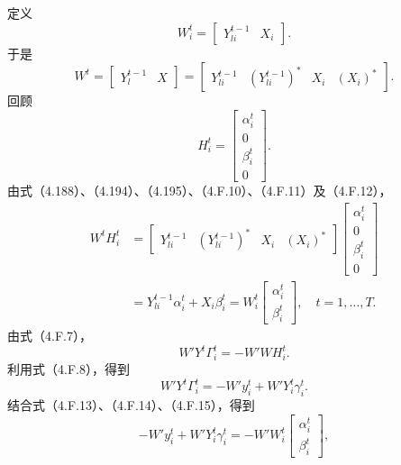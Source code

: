 定义
\begin{equation}
W_i^t=\begin{bmatrix}Y_{li}^{t-1}&X_i\end{bmatrix}.\tag{4.F.10}
\end{equation}
于是
\begin{equation}
W^t=\begin{bmatrix}Y_l^{t-1}&X\end{bmatrix}
=\begin{bmatrix}Y_{li}^{t-1}&(Y_{li}^{t-1})^*&X_i&(X_i)^*\end{bmatrix}.\tag{4.F.11}
\end{equation}
回顾
\begin{equation}
H_i^t=\begin{bmatrix}\alpha_i^t\\0\\\beta_i^t\\0\end{bmatrix}.\tag{4.F.12}
\end{equation}
由式（4.188）、（4.194）、（4.195）、（4.F.10）、（4.F.11）及（4.F.12），
\begin{equation}
\begin{aligned}
W^tH_i^t
&=\begin{bmatrix}Y_{li}^{t-1}&(Y_{li}^{t-1})^*&X_i&(X_i)^*\end{bmatrix}
\begin{bmatrix}\alpha_i^t\\0\\\beta_i^t\\0\end{bmatrix}\\
&=Y_{li}^{t-1}\alpha_i^t+X_i\beta_i^t
=W_i^t\begin{bmatrix}\alpha_i^t\\\beta_i^t\end{bmatrix},
\quad t=1,\ldots,T.
\end{aligned}\tag{4.F.13}
\end{equation}
由式（4.F.7），
\begin{equation}
W'Y^t\Gamma_i^t=-W'WH_i^t.\tag{4.F.14}
\end{equation}
利用式（4.F.8），得到
\begin{equation}
W'Y^t\Gamma_i^t=-W'y_i^t+W'Y_i^t\gamma_i^t.\tag{4.F.15}
\end{equation}
结合式（4.F.13）、（4.F.14）、（4.F.15），得到
\[
-W'y_i^t+W'Y_i^t\gamma_i^t=-W'W_i^t\begin{bmatrix}\alpha_i^t\\\beta_i^t\end{bmatrix},
\]
